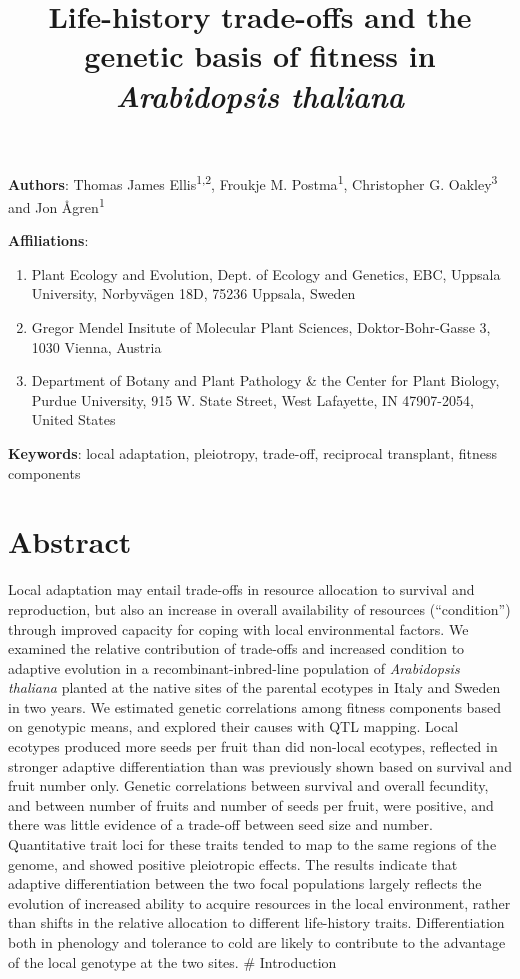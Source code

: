\documentclass[]{article}
\title{Life-history trade-offs and the genetic basis of fitness in \emph{Arabidopsis thaliana}}
\author{}
\date{\vspace{-2.5em}}
\providecommand{\tightlist}{%
  \setlength{\itemsep}{0pt}\setlength{\parskip}{0pt}}
\begin{document}
\maketitle

\textbf{Authors}: Thomas James Ellis\textsuperscript{1,2}, Froukje M. Postma\textsuperscript{1}, Christopher G. Oakley\textsuperscript{3} and Jon Ågren\textsuperscript{1}

\textbf{Affiliations}:

\begin{enumerate}
\def\labelenumi{\arabic{enumi}.}
\tightlist
\item
  Plant Ecology and Evolution, Dept. of Ecology and Genetics, EBC, Uppsala University, Norbyvägen 18D, 75236 Uppsala, Sweden
\item
  Gregor Mendel Insitute of Molecular Plant Sciences, Doktor-Bohr-Gasse 3, 1030 Vienna, Austria
\item
  Department of Botany and Plant Pathology \& the Center for Plant Biology, Purdue University, 915 W. State Street, West Lafayette, IN 47907-2054, United States
\end{enumerate}

\textbf{Keywords}: local adaptation, pleiotropy, trade-off, reciprocal transplant, fitness components

\newpage

\hypertarget{abstract}{%
\section{Abstract}\label{abstract}}

Local adaptation may entail trade-offs in resource allocation to survival and reproduction, but also an increase in overall availability of resources (``condition'') through improved capacity for coping with local environmental factors. We examined the relative contribution of trade-offs and increased condition to adaptive evolution in a recombinant-inbred-line population of \emph{Arabidopsis thaliana} planted at the native sites of the parental ecotypes in Italy and Sweden in two years. We estimated genetic correlations among fitness components based on genotypic means, and explored their causes with QTL mapping. Local ecotypes produced more seeds per fruit than did non-local ecotypes, reflected in stronger adaptive differentiation than was previously shown based on survival and fruit number only. Genetic correlations between survival and overall fecundity, and between number of fruits and number of seeds per fruit, were positive, and there was little evidence of a trade-off between seed size and number. Quantitative trait loci for these traits tended to map to the same regions of the genome, and showed positive pleiotropic effects. The results indicate that adaptive differentiation between the two focal populations largely reflects the evolution of increased ability to acquire resources in the local environment, rather than shifts in the relative allocation to different life-history traits. Differentiation both in phenology and tolerance to cold are likely to contribute to the advantage of the local genotype at the two sites.
\# Introduction
\end{document}
